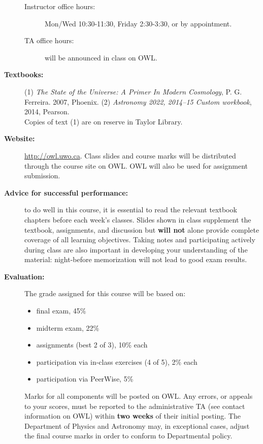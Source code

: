 \documentclass[12pt]{article}
\begin{document}
\begin{description}
\begin{description}
   \item[Instructor office hours:]
   {Mon/Wed 10:30-11:30, Friday 2:30-3:30, or by appointment.} 

  \item[TA office hours:] will be announced in class on OWL.

   \end{description}

\item[\bf Textbooks:] (1) {\it The State of the Universe: A Primer In Modern Cosmology}, P. G. Ferreira. 2007, Phoenix.
(2) {\it Astronomy 2022, 2014--15 Custom workbook}, 2014, Pearson.\\
Copies of text (1) are on reserve in Taylor Library. 

\item[\bf Website:] \url{http://owl.uwo.ca}. Class slides and course marks will be distributed through the course site
on OWL. OWL will also be used for assignment submission.

\item[\bf Advice for successful performance:] to do well in this course, it is essential to read the relevant textbook chapters before
each week's classes. Slides shown in class supplement the textbook, assignments, and discussion but {\bf will not} alone provide
complete coverage of all learning objectives. Taking notes and participating actively during class  are also important in developing
your understanding of the material: night-before memorization will not lead to good exam results.

\newpage


\item[\bf Evaluation:] The grade assigned for this course will be based on: 
\begin{itemize}
\item final exam, 45\%
\item midterm exam, 22\% 
\item assignments (best 2 of 3), 10\% each
\item participation via in-class exercises (4 of 5), 2\% each
\item participation via PeerWise, 5\%
\end{itemize}
Marks for all components will be posted on OWL. Any errors, or appeals to your scores, must be reported to 
the administrative TA (see contact information on OWL) within {\bf two weeks} of their initial posting.
The Department of Physics and Astronomy may, in exceptional cases, adjust the final course marks in order to conform to Departmental policy.


\end{description}
\end{document}
